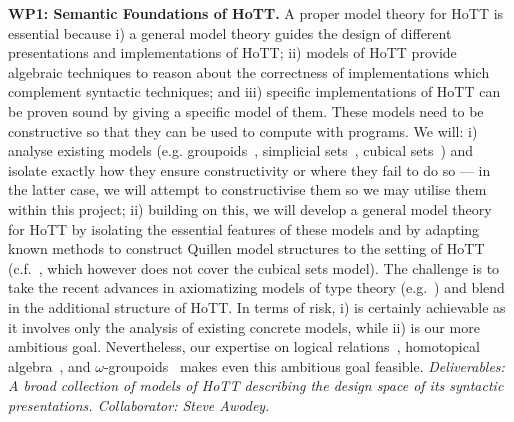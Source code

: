 \documentclass[a4paper,11pt]{article}
\begin{document}
{\bf WP1: Semantic Foundations of HoTT.}  A proper model theory for
HoTT is essential because i) a general model theory guides the design
of different presentations and implementations of HoTT; ii) models of
HoTT provide algebraic techniques to reason about the correctness of
implementations which complement syntactic techniques; and iii)
specific implementations of HoTT can be proven sound by giving a
specific model of them.  These models need to be constructive so that
they can be used to compute with programs.
We will: i) analyse existing
models ({e.g.}  groupoids~\cite{HofmannM:groitt}, simplicial
sets~\cite{KapulkinC:simmuv}, cubical sets~\cite{BezemM:cubsmt}) and
isolate exactly how they ensure constructivity or where they fail to
do so --- in the latter case, we will attempt to constructivise them
so we may utilise them within this project;
ii) building on this, we will develop a general model theory for HoTT
by isolating the essential features of these models and by adapting
known methods to construct Quillen model structures to the setting of
HoTT ({c.f.}~\cite{ShulmanM:uniidh}, which however does not cover the
cubical sets model).  The challenge is to take the recent advances in
axiomatizing models of type theory ({e.g.}~\cite{AwodeyS:natmtt}) and
blend in the additional structure of HoTT. In terms of risk, i) is
certainly achievable as it involves only the analysis of existing
concrete models, while ii) is our more ambitious goal. Nevertheless, our
expertise on logical relations~\cite{neil2014relParamDep},
homotopical algebra~\cite{GambinoN:homl2c,GambinoN:weilsh}, and
$\omega$-groupoids~\cite{alti:csl12,alti:tlca13-hedberg} makes even this ambitious goal
feasible. {\em Deliverables: A broad collection of models of HoTT
  describing the design space of its syntactic presentations.
  Collaborator: Steve Awodey.  }
\end{document}
